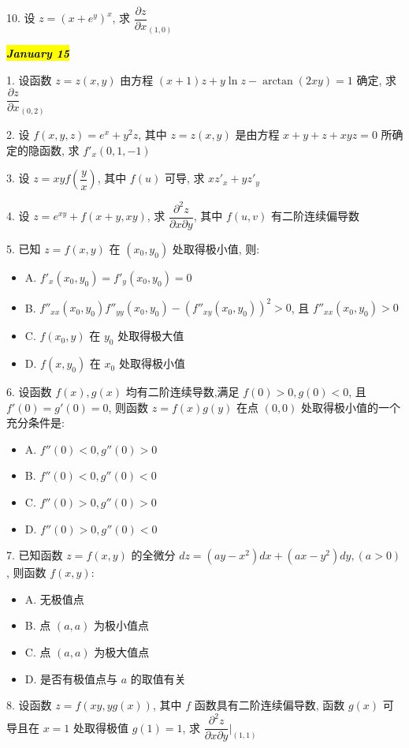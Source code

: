 10. 设 $z=(x+e^{y})^{x}$, 求 $\dfrac{\partial z}{\partial x}_{(1,0)}$

\hl{\textbf{\textit{January 15}}}

1. 设函数 $z=z(x,y)$ 由方程 $(x+1)z+y\ln z-\arctan(2xy)=1$ 确定, 求$\dfrac{\partial z}{\partial x}_{(0,2)}$

2. 设 $f(x,y,z)=e^{x}+y^{2}z$, 其中 $z=z(x,y)$ 是由方程 $x+y+z+xyz=0$ 所确定的隐函数, 求 $f'_{x}(0,1,-1)$

3. 设 $z=xyf(\dfrac{y}{x})$, 其中 $f(u)$ 可导, 求 $xz'_{x}+yz'_{y}$

4. 设 $z=e^{xy}+f(x+y,xy)$, 求 $\dfrac{\partial^{2} z}{\partial x\partial y}$, 其中 $f(u,v)$ 有二阶连续偏导数

5. 已知 $z=f(x,y)$ 在 $(x_{0},y_{0})$ 处取得极小值, 则:
\begin{itemize}
	\item A. $f'_{x}(x_{0},y_{0})=f'_{y}(x_{0},y_{0})=0$
	\item B. $f''_{xx}(x_{0},y_{0})f''_{yy}(x_{0},y_{0})-(f''_{xy}(x_{0},y_{0}))^{2}>0$, 且 $f''_{xx}(x_{0},y_{0})>0$
	\item C. $f(x_{0},y)$ 在 $y_{0}$ 处取得极大值
	\item D. $f(x,y_{0})$ 在 $x_{0}$ 处取得极小值
\end{itemize}

6. 设函数 $f(x),g(x)$ 均有二阶连续导数,满足 $f(0)>0,g(0)<0$, 且 $f'(0)=g'(0)=0$, 则函数 $z=f(x)g(y)$ 在点 $(0,0)$ 处取得极小值的一个充分条件是:
\begin{itemize}
	\item A. $f''(0)<0,g''(0)>0$
	\item B. $f''(0)<0,g''(0)<0$
	\item C. $f''(0)>0,g''(0)>0$
	\item D. $f''(0)>0,g''(0)<0$
\end{itemize}

7. 已知函数 $z=f(x,y)$ 的全微分 $dz=(ay-x^{2})dx+(ax-y^{2})dy,(a>0)$, 则函数 $f(x,y)$:
\begin{itemize}
	\item A. 无极值点
	\item B. 点 $(a,a)$ 为极小值点
	\item C. 点 $(a,a)$ 为极大值点
	\item D. 是否有极值点与 $a$ 的取值有关
\end{itemize}

8. 设函数 $z=f(xy,yg(x))$, 其中 $f$ 函数具有二阶连续偏导数, 函数 $g(x)$ 可导且在 $x=1$ 处取得极值 $g(1)=1$, 求 $\dfrac{\partial^{2}z}{\partial x\partial y}|_{(1,1)}$

